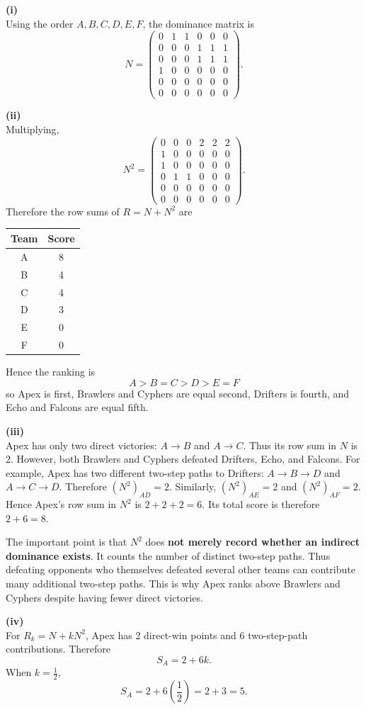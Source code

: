 \begin{solution}
\textbf{(i)}\\
Using the order $A, B, C, D, E, F$, the dominance matrix is
\[ N= \begin{pmatrix} 0&1&1&0&0&0\\ 0&0&0&1&1&1\\ 0&0&0&1&1&1\\ 1&0&0&0&0&0\\ 0&0&0&0&0&0\\ 0&0&0&0&0&0 \end{pmatrix}. \]

\textbf{(ii)}\\
Multiplying,
\[ N^2= \begin{pmatrix} 0&0&0&2&2&2\\ 1&0&0&0&0&0\\ 1&0&0&0&0&0\\ 0&1&1&0&0&0\\ 0&0&0&0&0&0\\ 0&0&0&0&0&0 \end{pmatrix}. \]
Therefore the row sums of $R=N+N^2$ are
\begin{center}
\begin{tabular}{c|c}
\textbf{Team} & \textbf{Score} \\
\hline
A & 8 \\
B & 4 \\
C & 4 \\
D & 3 \\
E & 0 \\
F & 0
\end{tabular}
\end{center}
Hence the ranking is
\[ \boxed{ A>B=C>D>E=F } \]
so Apex is first, Brawlers and Cyphers are equal second, Drifters is fourth, and Echo and Falcons are equal fifth.

\textbf{(iii)}\\
Apex has only two direct victories: $A\to B$ and $A\to C$. Thus its row sum in $N$ is 2.
However, both Brawlers and Cyphers defeated Drifters, Echo, and Falcons. For example, Apex has two different two-step paths to Drifters: $A\to B\to D$ and $A\to C\to D$. Therefore $(N^2)_{AD}=2$. 
Similarly, $(N^2)_{AE}=2$ and $(N^2)_{AF}=2$. Hence Apex's row sum in $N^2$ is $2+2+2=6$. Its total score is therefore $2+6=8$.

The important point is that $N^2$ does \textbf{not merely record whether an indirect dominance exists}. It counts the number of distinct two-step paths. Thus defeating opponents who themselves defeated several other teams can contribute many additional two-step paths. This is why Apex ranks above Brawlers and Cyphers despite having fewer direct victories.

\textbf{(iv)}\\
For $R_k=N+kN^2$, Apex has 2 direct-win points and 6 two-step-path contributions. Therefore
\[ \boxed{S_A=2+6k}. \]
When $k=\frac12$,
\[ S_A = 2+6\left(\frac12\right) = 2+3 = \boxed{5}. \]
\end{solution}

